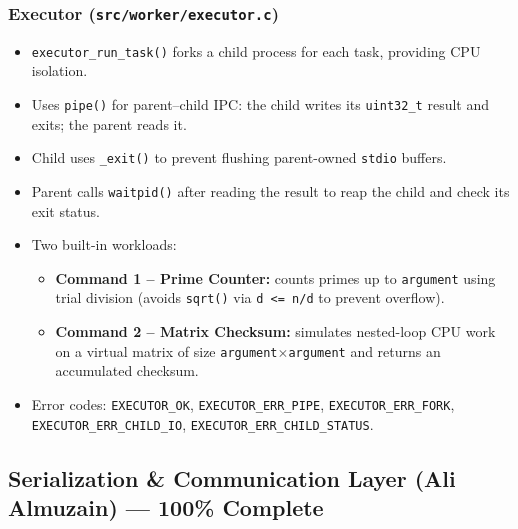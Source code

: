 \documentclass[12pt,a4paper]{article}
\begin{document}
\subsubsection{Executor (\texttt{src/worker/executor.c})}
\begin{itemize}[noitemsep]
    \item \texttt{executor\_run\_task()} forks a child process for each task, providing CPU isolation.
    \item Uses \texttt{pipe()} for parent--child IPC: the child writes its \texttt{uint32\_t} result and exits; the parent reads it.
    \item Child uses \texttt{\_exit()} to prevent flushing parent-owned \texttt{stdio} buffers.
    \item Parent calls \texttt{waitpid()} after reading the result to reap the child and check its exit status.
    \item Two built-in workloads:
    \begin{itemize}[noitemsep]
        \item \textbf{Command 1 -- Prime Counter:} counts primes up to \texttt{argument} using trial division (avoids \texttt{sqrt()} via \texttt{d <= n/d} to prevent overflow).
        \item \textbf{Command 2 -- Matrix Checksum:} simulates nested-loop CPU work on a virtual matrix of size \texttt{argument}$\times$\texttt{argument} and returns an accumulated checksum.
    \end{itemize}
    \item Error codes: \texttt{EXECUTOR\_OK}, \texttt{EXECUTOR\_ERR\_PIPE}, \texttt{EXECUTOR\_ERR\_FORK}, \texttt{EXECUTOR\_ERR\_CHILD\_IO}, \texttt{EXECUTOR\_ERR\_CHILD\_STATUS}.
\end{itemize}

\subsection{Serialization \& Communication Layer (Ali Almuzain) --- 100\% Complete}
\end{document}
